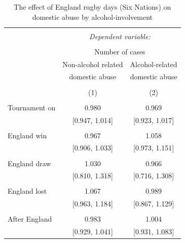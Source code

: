 \documentclass[12pt, a4paper]{article}
\begin{document}
\begin{table}[!htbp] \centering 
  \begin{threeparttable}
  \caption{The effect of England rugby days (Six Nations) on domestic abuse by alcohol-involvement} 
  \label{rugby} 
\begin{tabular}{@{\extracolsep{5pt}}lcc} 
\\[-1.8ex]\hline 
\hline \\[-1.8ex] 
 & \multicolumn{2}{c}{\textit{Dependent variable:}} \\ 
\cline{2-3} 
\\[-1.8ex] & \multicolumn{2}{c}{Number of cases} \\ 
 & Non-alcohol related & Alcohol-related\\ 
 & domestic abuse & domestic abuse\\
\\[-1.8ex] & (1) & (2)\\ 
\hline \\[-1.8ex] 
Tournament on & 0.980 & 0.969 \\ 
  & [0.947, 1.014] & [0.923, 1.017] \\ 
  & & \\ 
 England win & 0.967 & 1.058 \\ 
  & [0.906, 1.033] & [0.973, 1.151] \\ 
  & & \\ 
 England draw & 1.030 & 0.966 \\ 
  & [0.810, 1.318] & [0.716, 1.308] \\ 
  & & \\ 
 England lost & 1.067 & 0.989 \\ 
  & [0.963, 1.184] & [0.867, 1.129] \\ 
  & & \\ 
 After England & 0.983 & 1.004 \\ 
  & [0.929, 1.041] & [0.931, 1.083] \\ 


\end{tabular}
\end{threeparttable}
\end{table}
\end{document}
